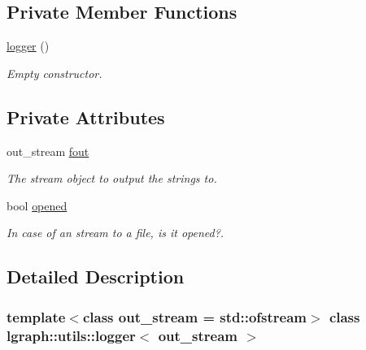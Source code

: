 \subsection*{Private Member Functions}
\begin{DoxyCompactItemize}
\item 
\hyperlink{classlgraph_1_1utils_1_1logger_ace2028a4b282e3cb6593f6f62fee2f2b}{logger} ()
\begin{DoxyCompactList}\small\item\em Empty constructor. \end{DoxyCompactList}\end{DoxyCompactItemize}
\subsection*{Private Attributes}
\begin{DoxyCompactItemize}
\item 
\mbox{\label{classlgraph_1_1utils_1_1logger_aafc1693e642fc967fed16b78d5cd8a5f}} 
out\+\_\+stream \hyperlink{classlgraph_1_1utils_1_1logger_aafc1693e642fc967fed16b78d5cd8a5f}{fout}
\begin{DoxyCompactList}\small\item\em The stream object to output the strings to. \end{DoxyCompactList}\item 
\mbox{\label{classlgraph_1_1utils_1_1logger_a2e159433db285ccfc8120a4aa4ea7481}} 
bool \hyperlink{classlgraph_1_1utils_1_1logger_a2e159433db285ccfc8120a4aa4ea7481}{opened}
\begin{DoxyCompactList}\small\item\em In case of an stream to a file, is it opened?. \end{DoxyCompactList}\end{DoxyCompactItemize}


\subsection{Detailed Description}
\subsubsection*{template$<$class out\+\_\+stream = std\+::ofstream$>$\newline
class lgraph\+::utils\+::logger$<$ out\+\_\+stream $>$}

